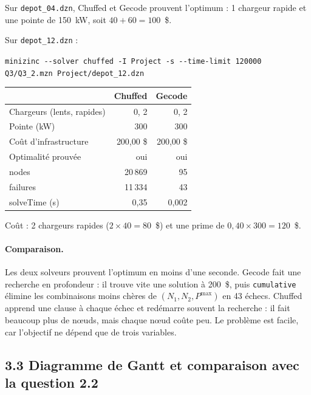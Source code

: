 \documentclass{article}
\begin{document}
Sur \texttt{depot\_04.dzn}, Chuffed et Gecode prouvent l'optimum : 1 chargeur rapide et une pointe de 150~kW, soit $40 + 60 = 100$~\$.

Sur \texttt{depot\_12.dzn} :
\begin{center}\small\texttt{minizinc -{}-solver chuffed -I Project -s -{}-time-limit 120000 Q3/Q3\_2.mzn Project/depot\_12.dzn}\end{center}

\begin{center}
\begin{tabular}{lrr}
\hline
 & Chuffed & Gecode \\
\hline
Chargeurs (lents, rapides) & 0, 2 & 0, 2 \\
Pointe (kW) & 300 & 300 \\
Coût d'infrastructure & 200,00 \$ & 200,00 \$ \\
Optimalité prouvée & oui & oui \\
nodes & 20\,869 & 95 \\
failures & 11\,334 & 43 \\
solveTime (s) & 0,35 & 0,002 \\
\hline
\end{tabular}
\end{center}

Coût : 2 chargeurs rapides ($2 \times 40 = 80$~\$) et une prime de $0{,}40 \times 300 = 120$~\$.

\paragraph{Comparaison.} Les deux solveurs prouvent l'optimum en moins d'une seconde. Gecode fait une recherche en profondeur : il trouve vite une solution à 200~\$, puis \texttt{cumulative} élimine les combinaisons moins chères de $(N_1, N_2, P^{\max})$ en 43 échecs. Chuffed apprend une clause à chaque échec et redémarre souvent la recherche : il fait beaucoup plus de nœuds, mais chaque nœud coûte peu. Le problème est facile, car l'objectif ne dépend que de trois variables.

\subsection*{3.3 Diagramme de Gantt et comparaison avec la question 2.2}
\end{document}
